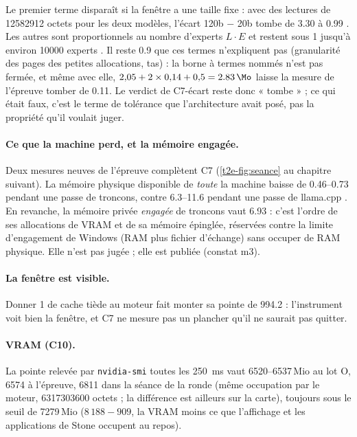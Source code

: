 Le premier terme disparaît si la fenêtre a une taille fixe : avec des lectures de \num{12582912} octets pour les deux modèles, l'écart 120b $-$ 20b tombe de \SI{3.30}{\Mo} à \SI{0.99}{\Mo} \mes. Les autres sont proportionnels au nombre d'experts $L \cdot E$ et restent sous \SI{1}{\Mo} jusqu'à environ \num{10000} experts \calc. Il reste \SI{0.9}{\Mo} que ces termes n'expliquent pas (granularité des pages des petites allocations, tas) : la borne à termes nommés n'est pas fermée, et même avec elle, $2{,}05 + 2 \times 0{,}14 + 0{,}5 = \SI{2.83}{\Mo}$ laisse la mesure de l'épreuve tomber de \SI{0.11}{\Mo}. Le verdict de C7-écart reste donc « tombe » ; ce qui était faux, c'est le terme de tolérance que l'architecture avait posé, pas la propriété qu'il voulait juger.

\paragraph{Ce que la machine perd, et la mémoire engagée.} Deux mesures neuves de l'épreuve complètent C7 (\cref{t2e-fig:seance} au chapitre suivant). La mémoire physique disponible de \emph{toute} la machine baisse de \SIrange{0.46}{0.73}{\Go} pendant une passe de troncons, contre \SIrange{6.3}{11.6}{\Go} pendant une passe de llama.cpp \mes. En revanche, la mémoire privée \emph{engagée} de troncons vaut \SI{6.93}{\Go} : c'est l'ordre de ses allocations de VRAM et de sa mémoire épinglée, réservées contre la limite d'engagement de Windows (RAM plus fichier d'échange) sans occuper de RAM physique. Elle n'est pas jugée ; elle est publiée (constat m3).

\paragraph{La fenêtre est visible.} Donner \SI{1}{\Go} de cache tiède au moteur fait monter sa pointe de \SI{994.2}{\Mo} \mes : l'instrument voit bien la fenêtre, et C7 ne mesure pas un plancher qu'il ne saurait pas quitter.

\paragraph{VRAM (C10).} La pointe relevée par \texttt{nvidia-smi} toutes les \SI{250}{\milli\second} vaut \numrange{6520}{6537}\,Mio au lot O, \num{6574} à l'épreuve, \num{6811} dans la séance de la ronde (même occupation par le moteur, \num{6317303600} octets ; la différence est ailleurs sur la carte), toujours sous le seuil de \num{7279}\,Mio ($8\,188 - 909$, la VRAM moins ce que l'affichage et les applications de Stone occupent au repos).

